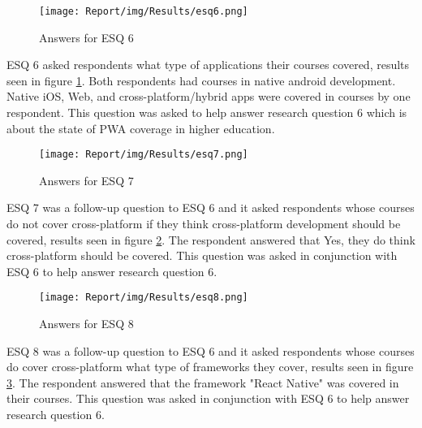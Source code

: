 \documentclass[a4paper,12pt]{article}
\begin{document}
\begin{figure}[ht!]
    \centering
    \texttt{[image: Report/img/Results/esq6.png]}
    \caption{Answers for ESQ 6}
    \label{fig:res_eduq6}
\end{figure}

\newpage
ESQ 6 asked respondents what type of applications their courses covered, results seen in figure \ref{fig:res_eduq6}. Both respondents had courses in native android development. Native iOS, Web, and cross-platform/hybrid apps were covered in courses by one respondent. This question was asked to help answer research question 6 which is about the state of PWA coverage in higher education. 

\begin{figure}[ht!]
    \centering
    \texttt{[image: Report/img/Results/esq7.png]}
    \caption{Answers for ESQ 7}
    \label{fig:res_eduq7}
\end{figure}

ESQ 7 was a follow-up question to ESQ 6 and it asked respondents whose courses do not cover cross-platform if they think cross-platform development should be covered, results seen in figure \ref{fig:res_eduq7}. The respondent answered that Yes, they do think cross-platform should be covered. This question was asked in conjunction with ESQ 6 to help answer research question 6.

\begin{figure}[ht!]
    \centering
    \texttt{[image: Report/img/Results/esq8.png]}
    \caption{Answers for ESQ 8}
    \label{fig:res_eduq8}
\end{figure}

\newpage
ESQ 8 was a follow-up question to ESQ 6 and it asked respondents whose courses do cover cross-platform what type of frameworks they cover, results seen in figure \ref{fig:res_eduq8}. The respondent answered that the framework "React Native" was covered in their courses. This question was asked in conjunction with ESQ 6 to help answer research question 6.
\end{document}
